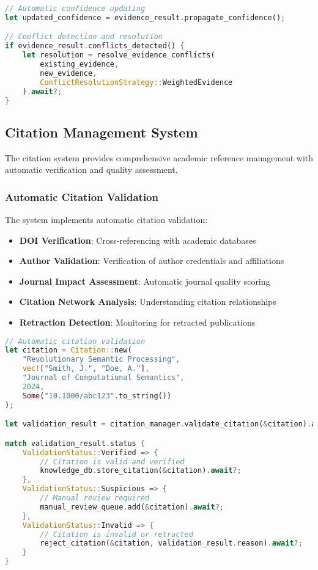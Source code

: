 \documentclass[12pt,a4paper,twoside]{article}
\begin{document}
\begin{itemize}
\begin{lstlisting}[language=rust,caption=Evidence Integration Process]
// Automatic confidence updating
let updated_confidence = evidence_result.propagate_confidence();

// Conflict detection and resolution
if evidence_result.conflicts_detected() {
    let resolution = resolve_evidence_conflicts(
        existing_evidence,
        new_evidence,
        ConflictResolutionStrategy::WeightedEvidence
    ).await?;
}
\end{lstlisting}

\subsection{Citation Management System}

The citation system provides comprehensive academic reference management with automatic verification and quality assessment.

\subsubsection{Automatic Citation Validation}

The system implements automatic citation validation:

\begin{itemize}
\item \textbf{DOI Verification}: Cross-referencing with academic databases
\item \textbf{Author Validation}: Verification of author credentials and affiliations
\item \textbf{Journal Impact Assessment}: Automatic journal quality scoring
\item \textbf{Citation Network Analysis}: Understanding citation relationships
\item \textbf{Retraction Detection}: Monitoring for retracted publications
\end{itemize}

\begin{lstlisting}[language=rust,caption=Citation Validation System]
// Automatic citation validation
let citation = Citation::new(
    "Revolutionary Semantic Processing",
    vec!["Smith, J.", "Doe, A."],
    "Journal of Computational Semantics",
    2024,
    Some("10.1000/abc123".to_string())
);

let validation_result = citation_manager.validate_citation(&citation).await?;

match validation_result.status {
    ValidationStatus::Verified => {
        // Citation is valid and verified
        knowledge_db.store_citation(&citation).await?;
    },
    ValidationStatus::Suspicious => {
        // Manual review required
        manual_review_queue.add(&citation).await?;
    },
    ValidationStatus::Invalid => {
        // Citation is invalid or retracted
        reject_citation(&citation, validation_result.reason).await?;
    }
}
\end{lstlisting}


\end{itemize}
\end{document}
